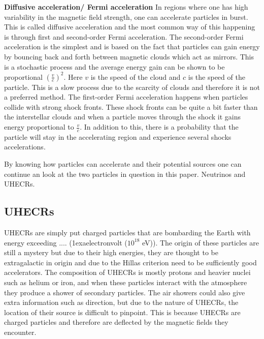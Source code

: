 \documentclass{article}
\begin{document}
\textbf{Diffusive acceleration/ Fermi acceleration}
In regions where one has high variability in the magnetic field strength, one can accelerate particles in burst. 
This is called diffusive acceleration and the most common way of this happening is through first and second-order Fermi acceleration.
The second-order Fermi acceleration is the simplest and is based on the fact that particles can gain energy by bouncing back and forth between magnetic clouds which act as mirrors. 
This is a stochastic process and the average energy gain can be shown to be proportional $(\frac{v}{c})^2$. Here $v$ is the speed of the cloud 
and $c$ is the speed of the particle. This is a slow process due to the scarcity of clouds and therefore it is not a preferred method.
The first-order Fermi acceleration happens when particles collide with strong shock fronts. These shock fronts can be quite a bit faster than the interstellar clouds
and when a particle moves through the shock it gains energy proportional to $\frac{v}{c}$. In addition to this, there is a probability that the particle will stay in the accelerating region and 
experience several shocks accelerations. 

By knowing how particles can accelerate and their potential sources one can continue an look at the two particles in question in this paper. 
Neutrinos and UHECRs.
\subsection{UHECRs}

UHECRs are simply put charged particles that are bombarding the Earth with energy exceeding .... (1exaelectronvolt ($10^{18}$ eV)). The origin of 
these particles are still a mystery but due to their high energies, they are thought to be extragalactic in origin and due to the Hillas criterion need to be sufficiently good accelerators.
The composition of UHECRs is mostly protons and heavier nuclei such as helium or iron, and when these particles interact with the atmosphere they produce a shower of secondary particles.
The air showers could also give extra information such as direction, but due to the nature of UHECRs, the location of their source is
difficult to pinpoint. This is because UHECRs are charged particles and therefore are deflected by the magnetic fields they encounter.
\end{document}
